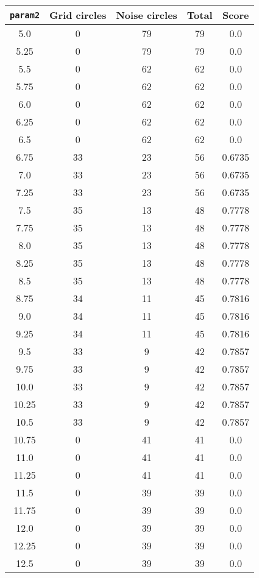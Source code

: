 \documentclass[letterpaper, 12pt]{article}
\begin{document}
\begin{longtable}{|c|c|c|c|c|}
\hline
\textbf{\texttt{param2}} & \textbf{Grid circles} & \textbf{Noise circles} & \textbf{Total} & \textbf{Score} \\
\hline
5.0 & 0 & 79 & 79 & 0.0 \\
\hline
5.25 & 0 & 79 & 79 & 0.0 \\
\hline
5.5 & 0 & 62 & 62 & 0.0 \\
\hline
5.75 & 0 & 62 & 62 & 0.0 \\
\hline
6.0 & 0 & 62 & 62 & 0.0 \\
\hline
6.25 & 0 & 62 & 62 & 0.0 \\
\hline
6.5 & 0 & 62 & 62 & 0.0 \\
\hline
6.75 & 33 & 23 & 56 & 0.6735 \\
\hline
7.0 & 33 & 23 & 56 & 0.6735 \\
\hline
7.25 & 33 & 23 & 56 & 0.6735 \\
\hline
7.5 & 35 & 13 & 48 & 0.7778 \\
\hline
7.75 & 35 & 13 & 48 & 0.7778 \\
\hline
8.0 & 35 & 13 & 48 & 0.7778 \\
\hline
8.25 & 35 & 13 & 48 & 0.7778 \\
\hline
8.5 & 35 & 13 & 48 & 0.7778 \\
\hline
8.75 & 34 & 11 & 45 & 0.7816 \\
\hline
9.0 & 34 & 11 & 45 & 0.7816 \\
\hline
9.25 & 34 & 11 & 45 & 0.7816 \\
\hline
9.5 & 33 & 9 & 42 & 0.7857 \\
\hline
9.75 & 33 & 9 & 42 & 0.7857 \\
\hline
10.0 & 33 & 9 & 42 & 0.7857 \\
\hline
10.25 & 33 & 9 & 42 & 0.7857 \\
\hline
10.5 & 33 & 9 & 42 & 0.7857 \\
\hline
10.75 & 0 & 41 & 41 & 0.0 \\
\hline
11.0 & 0 & 41 & 41 & 0.0 \\
\hline
11.25 & 0 & 41 & 41 & 0.0 \\
\hline
11.5 & 0 & 39 & 39 & 0.0 \\
\hline
11.75 & 0 & 39 & 39 & 0.0 \\
\hline
12.0 & 0 & 39 & 39 & 0.0 \\
\hline
12.25 & 0 & 39 & 39 & 0.0 \\
\hline
12.5 & 0 & 39 & 39 & 0.0 \\

\end{longtable}
\end{document}
